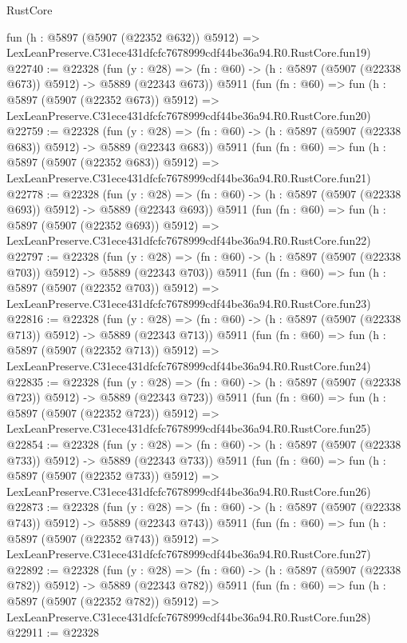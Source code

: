 \begin{lexlean}{RustCore}
\begin{coremodule}
    fun (h : @5897 (@5907 (@22352 @632)) @5912) =>
    LexLeanPreserve.C31ece431dfcfc7678999cdf44be36a94.R0.RustCore.fun19)
@22740 := @22328
    (fun (y : @28) => (fn : @60) -> (h : @5897 (@5907 (@22338 @673)) @5912) -> @5889 (@22343 @673))
    @5911
    (fun (fn : @60) =>
    fun (h : @5897 (@5907 (@22352 @673)) @5912) =>
    LexLeanPreserve.C31ece431dfcfc7678999cdf44be36a94.R0.RustCore.fun20)
@22759 := @22328
    (fun (y : @28) => (fn : @60) -> (h : @5897 (@5907 (@22338 @683)) @5912) -> @5889 (@22343 @683))
    @5911
    (fun (fn : @60) =>
    fun (h : @5897 (@5907 (@22352 @683)) @5912) =>
    LexLeanPreserve.C31ece431dfcfc7678999cdf44be36a94.R0.RustCore.fun21)
@22778 := @22328
    (fun (y : @28) => (fn : @60) -> (h : @5897 (@5907 (@22338 @693)) @5912) -> @5889 (@22343 @693))
    @5911
    (fun (fn : @60) =>
    fun (h : @5897 (@5907 (@22352 @693)) @5912) =>
    LexLeanPreserve.C31ece431dfcfc7678999cdf44be36a94.R0.RustCore.fun22)
@22797 := @22328
    (fun (y : @28) => (fn : @60) -> (h : @5897 (@5907 (@22338 @703)) @5912) -> @5889 (@22343 @703))
    @5911
    (fun (fn : @60) =>
    fun (h : @5897 (@5907 (@22352 @703)) @5912) =>
    LexLeanPreserve.C31ece431dfcfc7678999cdf44be36a94.R0.RustCore.fun23)
@22816 := @22328
    (fun (y : @28) => (fn : @60) -> (h : @5897 (@5907 (@22338 @713)) @5912) -> @5889 (@22343 @713))
    @5911
    (fun (fn : @60) =>
    fun (h : @5897 (@5907 (@22352 @713)) @5912) =>
    LexLeanPreserve.C31ece431dfcfc7678999cdf44be36a94.R0.RustCore.fun24)
@22835 := @22328
    (fun (y : @28) => (fn : @60) -> (h : @5897 (@5907 (@22338 @723)) @5912) -> @5889 (@22343 @723))
    @5911
    (fun (fn : @60) =>
    fun (h : @5897 (@5907 (@22352 @723)) @5912) =>
    LexLeanPreserve.C31ece431dfcfc7678999cdf44be36a94.R0.RustCore.fun25)
@22854 := @22328
    (fun (y : @28) => (fn : @60) -> (h : @5897 (@5907 (@22338 @733)) @5912) -> @5889 (@22343 @733))
    @5911
    (fun (fn : @60) =>
    fun (h : @5897 (@5907 (@22352 @733)) @5912) =>
    LexLeanPreserve.C31ece431dfcfc7678999cdf44be36a94.R0.RustCore.fun26)
@22873 := @22328
    (fun (y : @28) => (fn : @60) -> (h : @5897 (@5907 (@22338 @743)) @5912) -> @5889 (@22343 @743))
    @5911
    (fun (fn : @60) =>
    fun (h : @5897 (@5907 (@22352 @743)) @5912) =>
    LexLeanPreserve.C31ece431dfcfc7678999cdf44be36a94.R0.RustCore.fun27)
@22892 := @22328
    (fun (y : @28) => (fn : @60) -> (h : @5897 (@5907 (@22338 @782)) @5912) -> @5889 (@22343 @782))
    @5911
    (fun (fn : @60) =>
    fun (h : @5897 (@5907 (@22352 @782)) @5912) =>
    LexLeanPreserve.C31ece431dfcfc7678999cdf44be36a94.R0.RustCore.fun28)
@22911 := @22328

\end{coremodule}
\end{lexlean}
